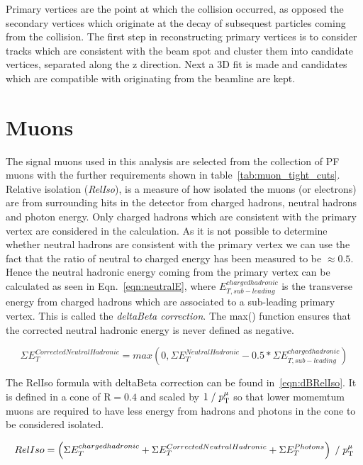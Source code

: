 Primary vertices are the point at which the collision occurred, as opposed the secondary vertices which originate at the decay of subsequest particles coming from the collision. The first step in reconstructing primary vertices is to consider tracks which are consistent with the beam spot and cluster them into candidate vertices, separated along the z direction. Next a 3D fit is made and candidates which are compatible with originating from the beamline are kept.

\section{Muons}
The signal muons used in this analysis are selected from the collection of PF muons with the further requirements shown in table~\ref{tab:muon_tight_cuts}.
Relative isolation (\emph{RelIso}), is a measure of how isolated the muons (or electrons) are from surrounding hits in the detector from charged hadrons, neutral hadrons and photon energy. Only charged hadrons which are consistent with the primary vertex are considered in the calculation. As it is not possible to determine whether neutral hadrons are consistent with the primary vertex we can use the fact that the ratio of neutral to charged energy has been measured to be $\approx 0.5$. Hence the neutral hadronic energy coming from the primary vertex can be calculated as seen in Eqn.~\ref{eqn:neutralE}, where $E_{T,sub-leading}^{charged hadronic}$ is the transverse energy from charged hadrons which are associated to a sub-leading primary vertex. This is called the \emph{deltaBeta correction}. The max() function ensures that the corrected neutral hadronic energy is never defined as negative.

\begin{centering}
\begin{equation}
\Sigma E_{T}^{Corrected Neutral Hadronic}  =  max(0, \Sigma E_{T}^{Neutral Hadronic} - 0.5*\Sigma E_{T,sub-leading}^{charged hadronic} )
\label{eqn:neutralE}
\end{equation}
\end{centering}



The RelIso formula with deltaBeta correction can be found in~\ref{eqn:dBRelIso}. It is defined in a cone of $\textrm{R}=0.4$ and scaled by $1\; / \;p_{\mathrm{T}}^{\mu}$ so that lower momemtum muons are required to have less energy from hadrons and photons in the cone to be considered isolated.

\begin{centering}
\begin{equation}
RelIso = \left( \Sigma E_{T}^{charged hadronic} + \Sigma E_{T}^{Corrected Neutral Hadronic} +  \Sigma E_{T}^{Photons} \right) \; / \;   p_{\mathrm{T}}^{\mu}
\label{eqn:dBRelIso}
\end{equation}
\end{centering}

